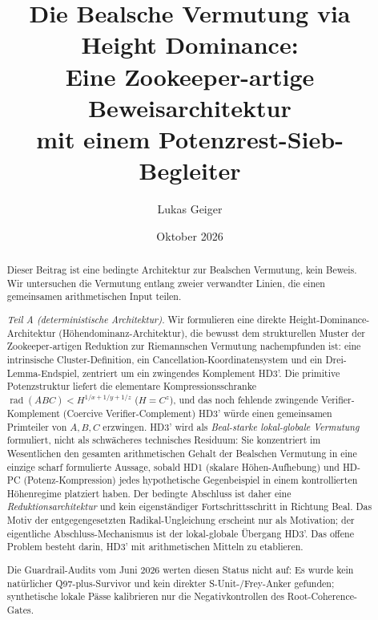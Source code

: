 \documentclass[11pt,a4paper]{article}
\title{Die Bealsche Vermutung via Height Dominance:\\
Eine Zookeeper-artige Beweisarchitektur\\
mit einem Potenzrest-Sieb-Begleiter}
\author{Lukas Geiger}
\date{Oktober 2026}
\DeclareMathOperator{\rad}{rad}
\begin{document}
\maketitle

\begin{abstract}
\enlargethispage{5\baselineskip}
\setlength{\parskip}{0.5ex}
Dieser Beitrag ist eine bedingte Architektur zur Bealschen Vermutung, kein
Beweis. Wir untersuchen die Vermutung entlang zweier verwandter Linien,
die einen gemeinsamen arithmetischen Input teilen.

\emph{Teil A (deterministische Architektur).}
Wir formulieren eine direkte Height-Dominance-Architektur (Höhendominanz-Architektur), die bewusst dem strukturellen Muster der Zookeeper-artigen Reduktion zur Riemannschen Vermutung nachempfunden ist: eine intrinsische Cluster-Definition, ein Cancellation-Koordinatensystem und ein Drei-Lemma-Endspiel, zentriert um ein zwingendes Komplement HD3'. Die primitive Potenzstruktur liefert die elementare Kompressionsschranke $\rad(ABC) < H^{1/x+1/y+1/z}$ ($H=C^z$),
und das noch fehlende zwingende Verifier-Komplement (Coercive Verifier-Complement) HD3' würde einen gemeinsamen Primteiler von $A,B,C$ erzwingen. HD3' wird als
\emph{Beal-starke lokal-globale Vermutung} formuliert, nicht als
schwächeres technisches Residuum: Sie konzentriert im Wesentlichen den
gesamten arithmetischen Gehalt der Bealschen Vermutung in eine einzige
scharf formulierte Aussage, sobald HD1 (skalare Höhen-Aufhebung) und
HD-PC (Potenz-Kompression) jedes hypothetische Gegenbeispiel in einem
kontrollierten Höhenregime platziert haben. Der bedingte Abschluss ist
daher eine \emph{Reduktionsarchitektur} und kein eigenständiger
Fortschrittsschritt in Richtung Beal. Das Motiv der entgegengesetzten
Radikal-Ungleichung erscheint nur als Motivation; der eigentliche
Abschluss-Mechanismus ist der lokal-globale Übergang HD3'. Das offene
Problem besteht darin, HD3' mit arithmetischen Mitteln zu etablieren.

Die Guardrail-Audits vom Juni 2026 werten diesen Status nicht auf: Es
wurde kein natürlicher Q97-plus-Survivor und kein direkter
S-Unit-/Frey-Anker gefunden; synthetische lokale Pässe kalibrieren nur
die Negativkontrollen des Root-Coherence-Gates.


\end{abstract}
\end{document}
